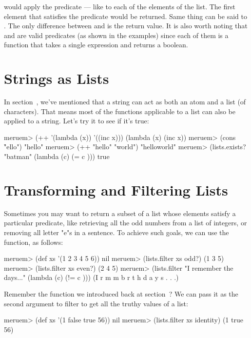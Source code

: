  would apply the predicate --- like  to each of the elements of the list. The first element that satisfies the predicate would be returned. Same thing can be said to . The only difference between  and  is the return value. It is also worth noting that  and  are valid predicates (as shown in the examples) since each of them is a function that takes a single expression and returns a boolean. 

\section{Strings as Lists}
In section~, we've mentioned that a string can act as both an atom and a list (of characters). That means most of the functions applicable to a list can also be applied to a string. Let's try it to see if it's true:

\begin{REPL}
meruem> (++ '(lambda (x)) '((inc x)))
(lambda (x) (inc x))
meruem> (cons \h "ello")
"hello"
meruem> (++ "hello" "world")
"helloworld"
meruem> (lists.exists? "batman" (lambda (c) (= c \a)))
true
\end{REPL}

\section{Transforming and Filtering Lists}
\label{sec:transform-filter}
Sometimes you may want to return a subset of a list whose elements satisfy a particular predicate, like retrieving all the odd numbers from a list of integers, or removing all letter "e"s in a sentence. To achieve such goals, we can use the  function, as follows:

\begin{REPL}
meruem> (def xs '(1 2 3 4 5 6))
nil
meruem> (lists.filter xs odd?) 
(1 3 5)
meruem> (lists.filter xs even?)
(2 4 5)
meruem> (lists.filter "I remember the days..." (lambda (c) (!= c \e)))
(I   r m m b r   t h   d a y s . . .)
\end{REPL}

Remember the  function we introduced back at section~? We can pass it as the second argument to filter to get all the truthy values of a list:

\begin{REPL}
meruem> (def xs '(1 false true 56))
nil
meruem> (lists.filter xs identity)
(1 true 56)
\end{REPL}

